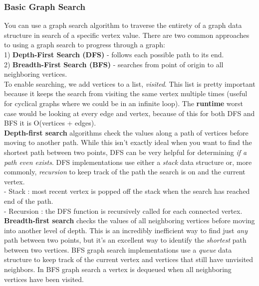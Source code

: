 \documentclass[11pt, a4paper]{article}
\begin{document}
\begin{spacing}{1.1}
	\subsubsection{Basic Graph Search}
	You can use a graph search algorithm to traverse the entirety of a graph data structure in search of a specific vertex value. There are two common approaches to using a graph search to progress through a graph: \\
	\hspace*{3mm} 1) \textbf{Depth-First Search (DFS)} - follows each possible path to its end. \\
	\hspace*{3mm} 2) \textbf{Breadth-First Search (BFS)} - searches from point of origin to all neighboring vertices. \vspace*{2mm} \\
	To enable searching, we add vertices to a list, \textit{visited}. This list is pretty important because it keeps the search from visiting the same vertex multiple times (useful for cyclical graphs where we could be in an infinite loop). The \textbf{runtime} worst case would be looking at every edge and vertex, because of this for both DFS and BFS it is O(vertices + edges). \vspace*{2mm} \\
	\textbf{Depth-first search} algorithms check the values along a path of vertices before moving to another path. While this isn’t exactly ideal when you want to find the shortest path between two points, DFS can be very helpful for determining \textit{if a path even exists}. DFS implementations use either a \textit{stack} data structure or, more commonly, \textit{recursion} to keep track of the path the search is on and the current vertex. \\
	\hspace*{3mm} - Stack : most recent vertex is popped off the stack when the search has reached end of the path. \\
	\hspace*{3mm} - Recursion : the DFS function is recursively called for each connected vertex. \vspace*{2mm} \\
	\textbf{Breadth-first search} checks the values of all neighboring vertices before moving into another level of depth. This is an incredibly inefficient way to find just \textit{any} path between two points, but it’s an excellent way to identify the \textit{shortest} path between two vertices. BFS graph search implementations use a \textit{queue} data structure to keep track of the current vertex and vertices that still have unvisited neighbors. In BFS graph search a vertex is dequeued when all neighboring vertices have been visited. \vspace*{2mm} \\

\end{spacing}
\end{document}

